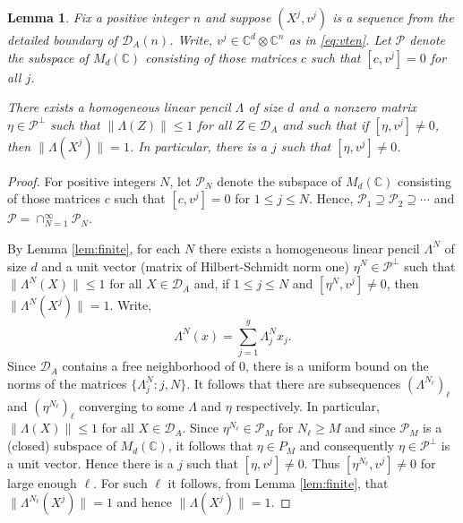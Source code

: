 \documentclass[12pt,makeidx]{amsart}
\newtheorem{lemma}[theorem]{Lemma}
\numberwithin{equation}{section}
\def\cD{ {{\mathcal D}}}
\def\cP{ {{\mathcal P}}}
\def\bbF{ {\mathbb C}}
\def\cD{ {\mathcal D} }
\def\cP{{\mathcal P}}
\def\size{d}
\def\Fdd{M_d(\mathbb C)}
\begin{document}
\begin{lemma}
\label{lem:countable}
 Fix a positive integer $n$ and suppose $(X^j,v^j)$ is a sequence from the detailed boundary of $\cD_A(n)$. Write, $v^j \in \bbF^d\otimes\bbF^n$ as in \eqref{eq:vten}.
Let $\mathcal P$ denote the subspace of $\Fdd$ consisting of those matrices $c$ such that $[ c,v^j]  =0$ for all $j$.

There exists a homogeneous linear pencil $\Lambda$ of size $\size$  and a nonzero matrix $\eta\in \mathcal P^\perp$ such that $\|\Lambda(Z)\|\le 1$ for all $Z\in \cD_A$  and such that if $[ \eta,v^j ] \ne 0 $, then $\|\Lambda(X^j)\|=1$. In particular, there is a $j$ such that $[ \eta,v^j] \ne 0$.
\end{lemma}

\begin{proof}
For positive integers $N$, 
let $\mathcal P_N$ denote the subspace of $\Fdd$ consisting of those matrices $c$ such that $[ c,v^j]  =0$ for $1\le j\le N$.  Hence, $\mathcal P_1 \supseteq \mathcal P_2 \supseteq \cdots$ and $\mathcal P=\cap_{N=1}^\infty \mathcal P_N$.


By Lemma \ref{lem:finite}, for each $N$ there exists a homogeneous
linear pencil $\Lambda^N$ of size $\size$ and a unit vector (matrix
of Hilbert-Schmidt norm one) $\eta^N \in \mathcal P^\perp$ such that
$\|\Lambda^N(X)\|\le 1$ for all $X\in \cD_A$ and, if $1\le j\le N$ and
$[ \eta^N, v^j ] \ne 0$, then $\|\Lambda^N(X^j)\|=1$. Write,
\[ 
 \Lambda^N(x)  = \sum_{j=1}^{g}\Lambda^N_j x_j.
\]
Since $\cD_A$ contains a free neighborhood of $0$, there is a uniform
bound on the norms of the matrices $\{\Lambda^N_j: j,N\}$. It follows
that there are subsequences $(\Lambda^{N_\ell})_\ell$ and
$(\eta^{N_\ell})_\ell$ converging to some $\Lambda$ and $\eta$
respectively. In particular, $\|\Lambda(X)\|\le 1$ for all
$X\in\cD_A$. Since $\eta^{N_\ell} \in \mathcal P_M$ for $N_\ell \ge M$
and since $\mathcal P_M$ is a (closed) subspace of $\Fdd$, it follows
that $\eta \in P_M$ and consequently $\eta \in \cP^\perp$ is a unit
vector. Hence there is a $j$ such that $[\eta,v^j]\ne 0$.  Thus $[
\eta^{N_\ell},v^j] \ne 0$ for large enough $\ell$. For such $\ell$ it
follows, from Lemma \ref{lem:finite}, that
$\|\Lambda^{N_\ell}(X^j)\|=1$ and hence $\|\Lambda(X^j)\|=1$.
\end{proof}
\end{document}
